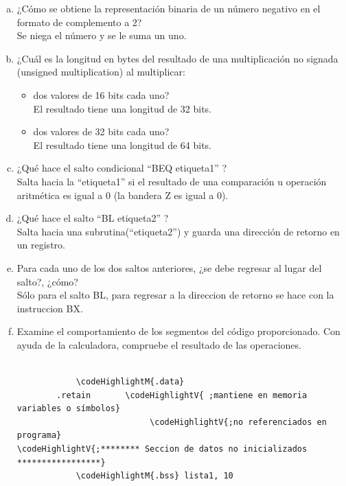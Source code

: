 \documentclass[a4paper,11pt]{article}                 %
\begin{document}
\begin{enumerate}[a)]
	\item ¿Cómo se obtiene la representación binaria de un número negativo en el formato de complemento a 2? 
	\\ \textsf{Se niega el número y se le suma un uno.}
	
	\item  ¿Cuál es la longitud en bytes del resultado de una multiplicación no signada (unsigned multiplication) al multiplicar: 
	\begin{itemize}
		\item  dos valores de 16 bits cada uno?
		\\ \textsf{El resultado tiene una longitud de 32 bits.}
		\item  dos valores de 32 bits cada uno? 
		\\ \textsf{El resultado tiene una longitud de 64 bits.}
	\end{itemize}
	
	
	\item  ¿Qué hace el salto condicional “BEQ etiqueta1” ? 
	\\ \textsf{Salta hacia la “etiqueta1” si el resultado de una comparación u operación aritmética es igual a 0 (la bandera Z es igual a 0).}
	\item  ¿Qué hace el salto “BL etiqueta2” ? 
	\\ \textsf{Salta hacia una subrutina(“etiqueta2”) y guarda una dirección de retorno en un registro.}
	
	\item  Para cada uno de los dos saltos anteriores, ¿se debe regresar al lugar del salto?, ¿cómo?
	\\ \textsf{Sólo para el salto BL, para regresar a la direccion de retorno se hace con la instruccion BX.}
	
	\item Examine el comportamiento de los segmentos del código proporcionado. Con ayuda de la calculadora, compruebe el resultado de las operaciones.
	
	\newcommand\codeHighlightM[1]{\textcolor[rgb]{.80,0,.60}{\textbf{#1}}}
\newcommand\codeHighlightV[1]{\textcolor[rgb]{.2,.8,0}{\textbf{#1}}}

	\begin{Verbatim}[commandchars=\\\{\}]
	
            \codeHighlightM{.data}
	    .retain       \codeHighlightV{ ;mantiene en memoria variables o símbolos}
                           \codeHighlightV{;no referenciados en programa}
\codeHighlightV{;******** Seccion de datos no inicializados *****************}
            \codeHighlightM{.bss} lista1, 10


\end{Verbatim}
\end{enumerate}
\end{document}
